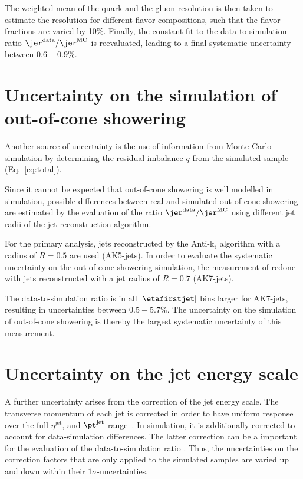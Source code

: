 The weighted mean of the quark and the gluon resolution is then taken to estimate the resolution for different flavor compositions, such that the flavor fractions are varied by 10\%.
Finally, the constant fit to the data-to-simulation ratio $\jer^{\text{data}}/\jer^{\text{MC}}$ is reevaluated, leading to a final systematic uncertainty between $0.6-0.9\%$.

\section*{Uncertainty on the simulation of out-of-cone showering}
Another source of uncertainty is the use of information from Monte Carlo simulation by determining the residual imbalance $q$ from the simulated \GAMJET sample (Eq.~\eqref{eq:total}).

Since it cannot be expected that out-of-cone showering is well modelled in simulation, possible differences between real and simulated out-of-cone showering are estimated by the evaluation of the ratio $\jer^{\text{data}}/\jer^{\text{MC}}$ using different jet radii of the jet reconstruction algorithm. 

For the primary analysis, jets reconstructed by the Anti-k$_{\text{t}}$ algorithm with a radius of $R=0.5$ are used (AK5-jets). 
In order to evaluate the systematic uncertainty on the out-of-cone showering simulation, the measurement of \rhores redone with jets reconstructed with a jet radius of $R=0.7$ (AK7-jets). 

The data-to-simulation ratio is in all $|\etafirstjet|$ bins larger for AK7-jets, resulting in uncertainties between $0.5-5.7\%$.
The uncertainty on the simulation of out-of-cone showering is thereby the largest systematic uncertainty of this measurement.



\section*{Uncertainty on the jet energy scale}
A further uncertainty arises from the correction of the jet energy scale.
The transverse momentum of each jet is corrected in order to have uniform response over the full $\eta^{\text{jet}}$, and $\pt^{\text{jet}}$ range~\cite{bib:CMS:JME_PAS}.
In simulation, it is additionally corrected to account for data-simulation differences.
The latter correction can be a important for the evaluation of the data-to-simulation ratio \rhores.
Thus, the uncertainties on the correction factors that are only applied to the simulated samples are varied up and down within their $1\sigma$-uncertainties.

